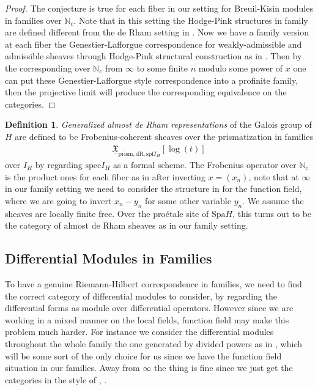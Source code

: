 \documentclass[12pt]{article}
\theoremstyle{definition}
\newtheorem{definition}{Definition}
\begin{document}
\begin{proof}
The conjecture is true for each fiber in our setting for Breuil-Kisin modules in families over $\mathbb{N}_c$. Note that in this setting the Hodge-Pink structures in family are defined different from the de Rham setting in \cite{5HK}. Now we have a family version at each fiber the Genestier-Lafforgue correspondence for weakly-admissible and admissible sheaves through Hodge-Pink structural construction as in \cite[Chapitre 6]{5GL2}. Then by the corresponding over $\mathbb{N}_c$ from $\infty$ to some finite $n$ modulo some power of $x$ one can put these Genestier-Lafforgue style correspondence into a profinite family, then the projective limit will produce the corresponding equivalence on the categories.
\end{proof}


\begin{definition}
\textit{Generalized almost de Rham representations} of the Galois group of $H$ are defined to be Frobenius-coherent sheaves over the prismatization in families
\begin{align}
\underline{\mathfrak{X}}_{\mathrm{prism},\mathrm{dR},\mathrm{spf}I_H}[\log(t)]
\end{align}
over $I_H$ by regarding $\mathrm{spec}I_H$ as a formal scheme. The Frobenius operator over $\mathbb{N}_c$ is the product ones for each fiber as in \cite{5HK} after inverting $x=(x_n)$, note that at $\infty$ in our family setting we need to consider the structure in \cite{5HK} for the function field, where we are going to invert $x_n-y_n$ for some other variable $y_n$. We assume the sheaves are locally finite free. Over the pro\'etale site of $\mathrm{Spa}H$, this turns out to be the category of almost de Rham sheaves as in our family setting.
\end{definition}


\subsection{Differential Modules in Families}

To have a genuine Riemann-Hilbert correspondence in families, we need to find the correct category of differential modules to consider, by regarding the differential forms as module over differential operators. However since we are working in a mixed manner on the local fields, function field may make this problem much harder. For instance we consider the differential modules throughout the whole family the one generated by divided powers as in \cite{5A}, which will be some sort of the only choice for us since we have the function field situation in our families. Away from $\infty$ the thing is fine since we just get the categories in the style of \cite{5BLA}, \cite{5BLB}.
\end{document}

